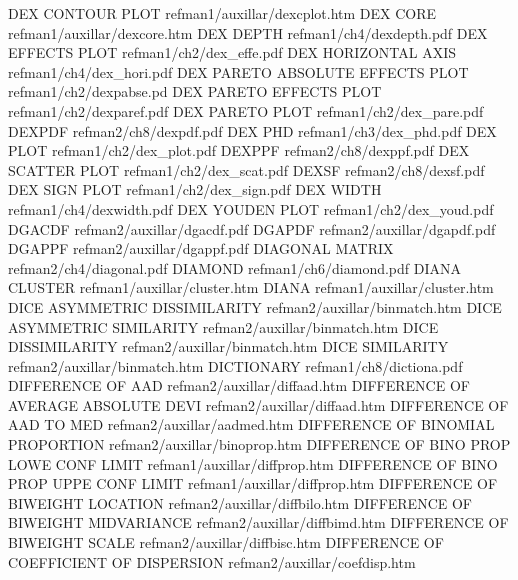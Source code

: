 DEX CONTOUR PLOT                        refman1/auxillar/dexcplot.htm
DEX CORE                                refman1/auxillar/dexcore.htm
DEX DEPTH                               refman1/ch4/dexdepth.pdf
DEX EFFECTS PLOT                        refman1/ch2/dex_effe.pdf
DEX HORIZONTAL AXIS                     refman1/ch4/dex_hori.pdf
DEX PARETO ABSOLUTE EFFECTS PLOT        refman1/ch2/dexpabse.pd
DEX PARETO EFFECTS PLOT                 refman1/ch2/dexparef.pdf
DEX PARETO PLOT                         refman1/ch2/dex_pare.pdf
DEXPDF                                  refman2/ch8/dexpdf.pdf
DEX PHD                                 refman1/ch3/dex_phd.pdf
DEX PLOT                                refman1/ch2/dex_plot.pdf
DEXPPF                                  refman2/ch8/dexppf.pdf
DEX SCATTER PLOT                        refman1/ch2/dex_scat.pdf
DEXSF                                   refman2/ch8/dexsf.pdf
DEX SIGN PLOT                           refman1/ch2/dex_sign.pdf
DEX WIDTH                               refman1/ch4/dexwidth.pdf
DEX YOUDEN PLOT                         refman1/ch2/dex_youd.pdf
DGACDF                                  refman2/auxillar/dgacdf.pdf
DGAPDF                                  refman2/auxillar/dgapdf.pdf
DGAPPF                                  refman2/auxillar/dgappf.pdf
DIAGONAL MATRIX                         refman2/ch4/diagonal.pdf
DIAMOND                                 refman1/ch6/diamond.pdf
DIANA CLUSTER                           refman1/auxillar/cluster.htm
DIANA                                   refman1/auxillar/cluster.htm
DICE ASYMMETRIC DISSIMILARITY           refman2/auxillar/binmatch.htm
DICE ASYMMETRIC SIMILARITY              refman2/auxillar/binmatch.htm
DICE DISSIMILARITY                      refman2/auxillar/binmatch.htm
DICE SIMILARITY                         refman2/auxillar/binmatch.htm
DICTIONARY                              refman1/ch8/dictiona.pdf
DIFFERENCE OF AAD                       refman2/auxillar/diffaad.htm
DIFFERENCE OF AVERAGE ABSOLUTE DEVI     refman2/auxillar/diffaad.htm
DIFFERENCE OF AAD TO MED                refman2/auxillar/aadmed.htm
DIFFERENCE OF BINOMIAL PROPORTION       refman2/auxillar/binoprop.htm
DIFFERENCE OF BINO PROP LOWE CONF LIMIT refman1/auxillar/diffprop.htm
DIFFERENCE OF BINO PROP UPPE CONF LIMIT refman1/auxillar/diffprop.htm
DIFFERENCE OF BIWEIGHT LOCATION         refman2/auxillar/diffbilo.htm
DIFFERENCE OF BIWEIGHT MIDVARIANCE      refman2/auxillar/diffbimd.htm
DIFFERENCE OF BIWEIGHT SCALE            refman2/auxillar/diffbisc.htm
DIFFERENCE OF COEFFICIENT OF DISPERSION refman2/auxillar/coefdisp.htm

